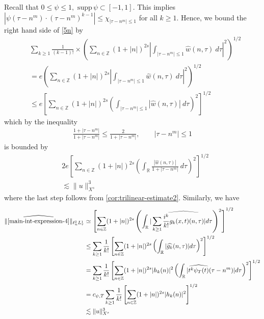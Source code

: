 \documentclass[12pt,reqno]{amsart}
\numberwithin{equation}{section}  %
\numberwithin{figure}{section}
\newcommand{\rr}{\mathbb{R}}
\newcommand{\zz}{\mathbb{Z}}
\newcommand{\wh}{\widehat}
\theoremstyle{plain}
\theoremstyle{definition}
\theoremstyle{remark}
\begin{document}
%
Recall that $0 \le \psi \le 1, \text{ supp} \, \psi \subset [-1,1 ]$. 
This implies $| \psi\left( \tau - n^{m } \right) \cdot \left( \tau - n^{m } \right)^{k 
-1} | \le \chi_{| \tau - n^{m } | \le 1}$ for all $k \ge 1$. Hence, we bound the
right hand side of \eqref{5n} by
%
\begin{equation*}
	\begin{split}
		& \sum_{k \ge 1} \frac{1}{(k-1)!} \times \left( \sum_{n \in \zz} (1 + | n |)^{2s}| 
		\int_{| \tau - n^{m}  |\le 1}  \wh{w}(n, \tau) \ d \tau |^2 
		\right)^{1/2}
    \\
    & = e \left( \sum_{n \in \zz} (1 + | n |)^{2s}| 
		\int_{| \tau - n^{m}  |\le 1}  \wh{w}(n, \tau) \ d \tau |^2 
		\right)^{1/2}
    \\
    & \le e \left[ \sum_{n \in \zz} (1 + | n |)^{2s}\left (  
		\int_{| \tau - n^{m}  |\le 1} | \wh{w}(n, \tau) | \ d \tau \right ) ^2 
		\right]^{1/2}
	\end{split}
\end{equation*}
%
which by the inequality
%
\begin{equation*}
	\begin{split}
		\frac{1 + | \tau - n^{m } |}{1 + | \tau  - n^{m } |} \le 
		\frac{2}{1 + | \tau - n^{m } |}, \qquad | \tau - n^{m }  | \le 1
	\end{split}
\end{equation*}
%
is bounded by 
%
\begin{equation}
\label{main-int4-est-X-s-part}
	\begin{split}
		& 2e \left[ \sum_{n \in \zz} (1 + | n |)^{2s}\left ( \int_\rr
		\frac{|\wh{w}(n, \tau)|}{1 + | \tau - n^{m } |} \ d \tau \right ) ^2 
		\right]^{1/2} \\
		& \lesssim \|u\|_{X^s}^3
	\end{split}
\end{equation}
%
where the last step follows from \autoref{cor:trilinear-estimate2}. Similarly,
we have
%
%
\begin{equation}
\label{main-int4-est-Y-s-part}
	\begin{split}
    \|\wh{\eqref{main-int-expression-4}}\|_{ \ell^2_n L^1_\tau }
		& \simeq \left[ \sum_{n \in
		\zz}(1 + | n |)^{2s} \left( \int_{\rr} | \sum_{k \ge 1}
		\wh{\frac{i^{k}}{k!}g_{k}(x,t)(n, \tau)} |d \tau \right)^{2} \right]^{1/2}
		\\
		& \le \sum_{k \ge 1} \frac{1}{k!} \left[ \sum_{n \in \zz} (1 + | n
    |)^{2s} \left( \int_{\rr} | \wh{g_{k}}(n, \tau) | d \tau \right)^{2}
		\right]^{1/2}
		\\
		& = \sum_{k \ge 1} \frac{1}{k!} \left[ \sum_{n \in \zz} (1 + | n
		|)^{2s} | h_{k}(n) |^2 \left( \int_{\rr} | \wh{t^{k} \psi_{T}(t)}(\tau -
		n^{m}) |d \tau \right)^{2} \right]^{1/2}
		\\
		& = c_{\psi, T} \sum_{k \ge 1} \frac{1}{k!} \left[ \sum_{n \in \zz} (1 + | n
		|)^{2s} | h_{k}(n) |^2 \right]^{1/2}
		\\
		& \lesssim \|u\|_{X^s}^{3}
	\end{split}
\end{equation}
\end{document}
